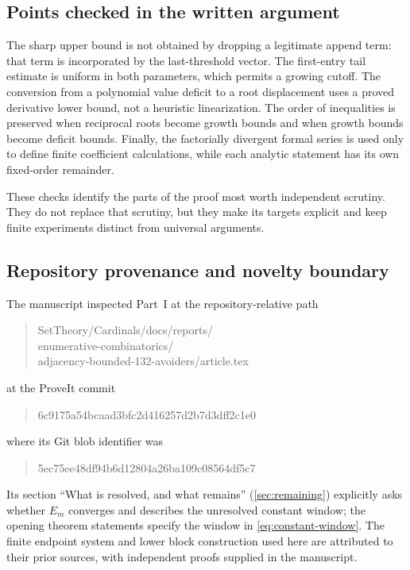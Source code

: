 \documentclass[11pt,a4paper]{article}
\theoremstyle{definition}\newaliascnt{definition}{theorem}
\theoremstyle{remark}\newaliascnt{remark}{theorem}
\begin{document}
\subsection{Points checked in the written argument}
The sharp upper bound is not obtained by dropping a legitimate append term:
that term is incorporated by the last-threshold vector. The first-entry tail
estimate is uniform in both parameters, which permits a growing cutoff. The
conversion from a polynomial value deficit to a root displacement uses a
proved derivative lower bound, not a heuristic linearization. The order of
inequalities is preserved when reciprocal roots become growth bounds and
when growth bounds become deficit bounds. Finally, the factorially divergent
formal series is used only to define finite coefficient calculations, while
each analytic statement has its own fixed-order remainder.

These checks identify the parts of the proof most worth independent
scrutiny. They do not replace that scrutiny, but they make its targets
explicit and keep finite experiments distinct from universal arguments.

\subsection{Repository provenance and novelty boundary}
\label{crem:sec:provenance}
The manuscript inspected Part~I at the repository-relative path
\begin{quote}\small\ttfamily
SetTheory/Cardinals/docs/reports/\\
enumerative-combinatorics/\\
adjacency-bounded-132-avoiders/article.tex
\end{quote}
at the ProveIt commit
\begin{quote}\small\ttfamily
6c9175a54bcaad3bfc2d416257d2b7d3dff2c1e0
\end{quote}
where its Git blob identifier was
\begin{quote}\small\ttfamily
5ec75ee48df94b6d12804a26ba109c08564df5c7
\end{quote}
Its section ``What is resolved, and what remains'' (\cref{sec:remaining})
explicitly asks whether $E_m$ converges and describes the unresolved
constant window; the opening theorem statements specify the window in
\eqref{eq:constant-window}. The finite endpoint system and lower block
construction used here are attributed to their prior sources, with
independent proofs supplied in the manuscript.
\end{document}
